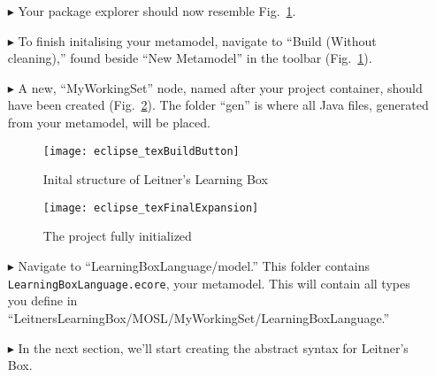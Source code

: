 \begin{itemize}
\item[$\blacktriangleright$] Your package explorer should now resemble Fig.~\ref{fig:preBuild}.

\item[$\blacktriangleright$] To finish initalising your metamodel, navigate to ``Build (Without cleaning),'' found beside ``New Metamodel'' in the
toolbar (Fig.~\ref{fig:preBuild}).

\item[$\blacktriangleright$] A new, ``MyWorkingSet'' node, named after your project container, should have been created (Fig.~\ref{fig:finalFiles}). The folder
``gen'' is where all Java files, generated from your metamodel, will be placed.

\clearpage

\begin{figure}[htbp]
	\centering
  \texttt{[image: eclipse\_texBuildButton]}
	\caption{Inital structure of Leitner's Learning Box}
	\label{fig:preBuild}
\end{figure} 

\vspace{0.5cm}

\begin{figure}[h!]
	\centering
  \texttt{[image: eclipse\_texFinalExpansion]}
	\caption{The project fully initialized}
	\label{fig:finalFiles}
\end{figure} 

\vspace{0.5cm}

\item[$\blacktriangleright$] Navigate to ``LearningBoxLanguage/model.'' This folder contains \\ \texttt{LearningBoxLanguage.ecore}, your metamodel. This will
contain all types you define in ``LeitnersLearningBox/MOSL/MyWorkingSet/LearningBoxLanguage.''

\item[$\blacktriangleright$] In the next section, we'll start creating the abstract syntax for Leitner's Box.


\end{itemize}
